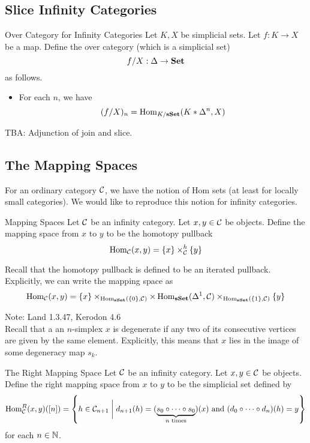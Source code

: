 \documentclass[a4paper]{article}
\begin{document}
\subsection{Slice Infinity Categories}
\begin{defn}{Over Category for Infinity Categories}{} Let $K,X$ be simplicial sets. Let $f:K\to X$ be a map. Define the over category (which is a simplicial set) $$f/X:\Delta\to\bold{Set}$$ as follows. 
\begin{itemize}
\item For each $n$, we have $$(f/X)_n=\operatorname{Hom}_{K/\bold{sSet}}(K\ast\Delta^n,X)$$
\end{itemize}
\end{defn}

TBA: Adjunction of join and slice. \\

\subsection{The Mapping Spaces}
For an ordinary category $\mathcal{C}$, we have the notion of Hom sets (at least for locally small categories). We would like to reproduce this notion for infinity categories. 

\begin{defn}{Mapping Spaces}{} Let $\mathcal{C}$ be an infinity category. Let $x,y\in\mathcal{C}$ be objects. Define the mapping space from $x$ to $y$ to be the homotopy pullback $$\operatorname{Hom}_{\mathcal{C}}(x,y)=\{x\}\times_{\mathcal{C}}^h\{y\}$$
\end{defn}

Recall that the homotopy pullback is defined to be an iterated pullback. Explicitly, we can write the mapping space as $$\operatorname{Hom}_{\mathcal{C}}(x,y)=\{x\}\times_{\operatorname{Hom}_\bold{sSet}(\{0\},\mathcal{C})}\times\operatorname{Hom}_\bold{sSet}(\Delta^1,\mathcal{C})\times_{\operatorname{Hom}_\bold{sSet}(\{1\},\mathcal{C})}\{y\}$$

Note: Land 1.3.47, Kerodon 4.6\\

Recall that a an $n$-simplex $x$ is degenerate if any two of its consecutive vertices are given by the same element. Explicitly, this means that $x$ lies in the image of some degeneracy map $s_k$. 

\begin{defn}{The Right Mapping Space}{} Let $\mathcal{C}$ be an infinity category. Let $x,y\in\mathcal{C}$ be objects. Define the right mapping space from $x$ to $y$ to be the simplicial set defined by $$\operatorname{Hom}_{\mathcal{C}}^R(x,y)([n])=\left\{h\in\mathcal{C}_{n+1}\;\bigg{|}\;d_{n+1}(h)=(\underbrace{s_0\circ\cdots\circ s_0}_{n\text{ times}})(x)\text{ and }(d_0\circ\cdots\circ d_n)(h)=y\right\}$$ for each $n\in\mathbb{N}$. 
\end{defn}
\end{document}

